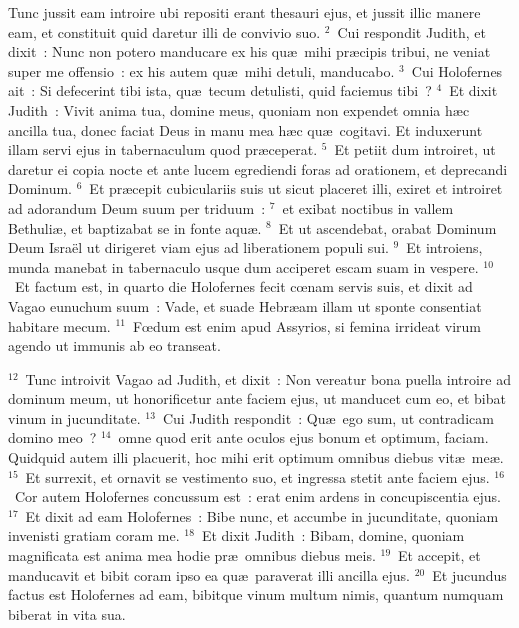 \lettrine[lines=3,image=true,loversize=0.05,lraise=-0.03]{T}{}unc jussit eam introire ubi repositi erant thesauri ejus, et jussit illic manere eam, et constituit quid daretur illi de convivio suo.
${}^{2}$~Cui respondit Judith, et dixit~: Nunc non potero manducare ex his qu\ae\ mihi pr\ae cipis tribui, ne veniat super me offensio~: ex his autem qu\ae\ mihi detuli, manducabo.
${}^{3}$~Cui Holofernes ait~: Si defecerint tibi ista, qu\ae\ tecum detulisti, quid faciemus tibi~?
${}^{4}$~Et dixit Judith~: Vivit anima tua, domine meus, quoniam non expendet omnia h\ae c ancilla tua, donec faciat Deus in manu mea h\ae c qu\ae\ cogitavi. Et induxerunt illam servi ejus in tabernaculum quod pr\ae ceperat.
${}^{5}$~Et petiit dum introiret, ut daretur ei copia nocte et ante lucem egrediendi foras ad orationem, et deprecandi Dominum.
${}^{6}$~Et pr\ae cepit cubiculariis suis ut sicut placeret illi, exiret et introiret ad adorandum Deum suum per triduum~:
${}^{7}$~et exibat noctibus in vallem Bethuli\ae , et baptizabat se in fonte aqu\ae .
${}^{8}$~Et ut ascendebat, orabat Dominum Deum Isra\"el ut dirigeret viam ejus ad liberationem populi sui.
${}^{9}$~Et introiens, munda manebat in tabernaculo usque dum acciperet escam suam in vespere.
${}^{10}$~Et factum est, in quarto die Holofernes fecit cœnam servis suis, et dixit ad Vagao eunuchum suum~: Vade, et suade Hebr\ae am illam ut sponte consentiat habitare mecum.
${}^{11}$~Fœdum est enim apud Assyrios, si femina irrideat virum agendo ut immunis ab eo transeat.


${}^{12}$~Tunc introivit Vagao ad Judith, et dixit~: Non vereatur bona puella introire ad dominum meum, ut honorificetur ante faciem ejus, ut manducet cum eo, et bibat vinum in jucunditate.
${}^{13}$~Cui Judith respondit~: Qu\ae\ ego sum, ut contradicam domino meo~?
${}^{14}$~omne quod erit ante oculos ejus bonum et optimum, faciam. Quidquid autem illi placuerit, hoc mihi erit optimum omnibus diebus vit\ae\ me\ae .
${}^{15}$~Et surrexit, et ornavit se vestimento suo, et ingressa stetit ante faciem ejus.
${}^{16}$~Cor autem Holofernes concussum est~: erat enim ardens in concupiscentia ejus.
${}^{17}$~Et dixit ad eam Holofernes~: Bibe nunc, et accumbe in jucunditate, quoniam invenisti gratiam coram me.
${}^{18}$~Et dixit Judith~: Bibam, domine, quoniam magnificata est anima mea hodie pr\ae\ omnibus diebus meis.
${}^{19}$~Et accepit, et manducavit et bibit coram ipso ea qu\ae\ paraverat illi ancilla ejus.
${}^{20}$~Et jucundus factus est Holofernes ad eam, bibitque vinum multum nimis, quantum numquam biberat in vita sua.


